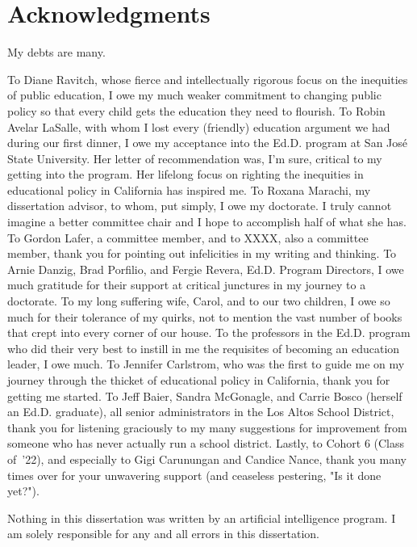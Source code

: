 \chapter{Acknowledgments}\indent%

My debts are many.
  
To Diane Ravitch, whose fierce and intellectually rigorous focus on the inequities of public education, I owe my much weaker commitment to changing public policy so that every child gets the education they need to flourish. To Robin Avelar LaSalle, with whom I lost every (friendly) education argument we had during our first dinner, I owe my acceptance into the Ed.D. program at San José State University. Her letter of recommendation was, I'm sure, critical to my getting into the program. Her lifelong focus on righting the inequities in educational policy in California has inspired me. To Roxana Marachi, my dissertation advisor, to whom, put simply, I owe my doctorate. I truly cannot imagine a better committee chair and I hope to accomplish half of what she has. To Gordon Lafer, a committee member, and to XXXX, also a committee member, thank you for pointing out infelicities in my writing and thinking. To Arnie Danzig, Brad Porfilio, and Fergie Revera, Ed.D. Program Directors, I owe much gratitude for their support at critical junctures in my journey to a doctorate. To my long suffering wife, Carol, and to our two children, I owe so much for their tolerance of my quirks, not to mention the vast number of books that crept into every corner of our house. To the professors in the Ed.D. program who did their very best to instill in me the requisites of becoming an education leader, I owe much. To Jennifer Carlstrom, who was the first to guide me on my journey through the thicket of educational policy in California, thank you for getting me started. To Jeff Baier, Sandra McGonagle, and Carrie Bosco (herself an Ed.D. graduate), all senior administrators in the Los Altos School District, thank you for listening graciously to my many suggestions for improvement from someone who has never actually run a school district. Lastly, to Cohort 6 (Class of\ '22), and especially to Gigi Carunungan and Candice Nance, thank you many times over for your unwavering support (and ceaseless pestering, "Is it done yet?").

Nothing in this dissertation was written by an artificial intelligence program. I am solely responsible for any and all errors in this dissertation.


